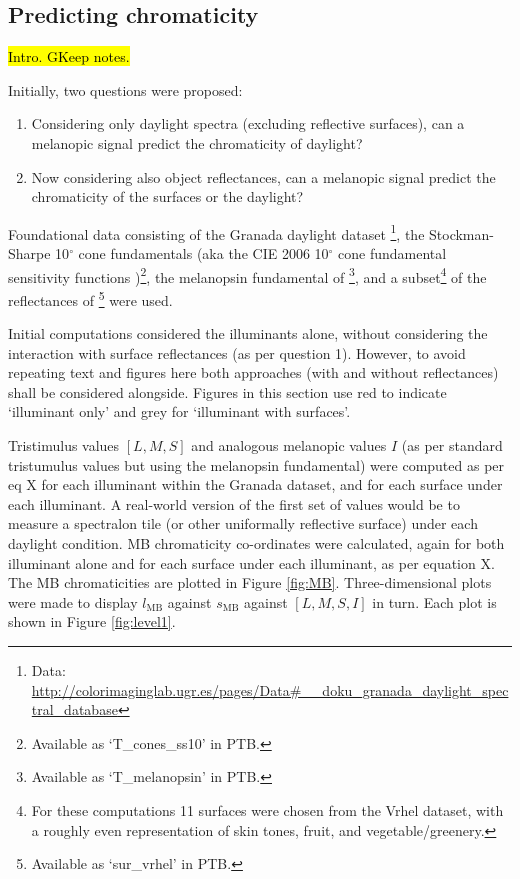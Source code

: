 \subsection{Predicting chromaticity}

\hl{Intro. GKeep notes.}

Initially, two questions were proposed:
\begin{enumerate}
\item Considering only daylight spectra (excluding reflective surfaces), can a melanopic signal predict the chromaticity of daylight? 
\item Now considering also object reflectances, can a melanopic signal predict the chromaticity of the surfaces or the daylight? 
\end{enumerate}

Foundational data consisting of 
the Granada daylight dataset 
\citep{hernandez-andres_color_2001}\footnote{Data: \url{http://colorimaginglab.ugr.es/pages/Data\#__doku_granada_daylight_spectral_database}},
the Stockman-Sharpe 10$^{\circ}$ cone fundamentals 
\citep{stockman_spectral_2000,stockman_spectral_1999}
(aka the CIE 2006 10$^{\circ}$ cone fundamental sensitivity functions \cite{cie_cie_2006})\footnote{Available as `T\_cones\_ss10' in \gls{PTB}.},
the melanopsin fundamental of \citet{lucas_measuring_2014}\footnote{Available as `T\_melanopsin' in \gls{PTB}.},
and a subset\footnote{For these computations 11 surfaces were chosen from the Vrhel dataset, with a roughly even representation of skin tones, fruit, and vegetable/greenery.} 
of the reflectances of \citet{vrhel_measurement_1994}\footnote{Available as `sur\_vrhel' in \gls{PTB}.}
were used.

Initial computations considered the illuminants alone, without considering the interaction with surface reflectances (as per question 1). However, to avoid repeating text and figures here both approaches (with and without reflectances) shall be considered alongside. Figures in this section use red to indicate `illuminant only' and grey for `illuminant with surfaces'. 

Tristimulus values $[L,M,S]$ and analogous melanopic values $I$ (as per standard tristumulus values but using the melanopsin fundamental) were computed as per eq X %
for each illuminant within the Granada dataset, and for each surface under each illuminant. A real-world version of the first set of values would be to measure a spectralon tile (or other uniformally reflective surface) under each daylight condition. \gls{MB} chromaticity co-ordinates were calculated, again for both illuminant alone and for each surface under each illuminant, as per equation X. %
The \gls{MB} chromaticities are plotted in Figure \ref{fig:MB}. Three-dimensional plots were made to display $l_{\text{MB}}$ against $s_{\text{MB}}$ against $[L,M,S,I]$ in turn. Each plot is shown in Figure \ref{fig:level1}. 

